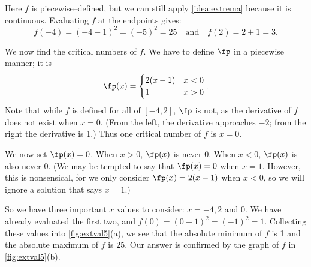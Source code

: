 {%
Here $f$ is piecewise--defined, but we can still apply \autoref{idea:extrema} because it is continuous. Evaluating $f$ at the endpoints gives: 
\[f(-4)=(-4-1)^2=(-5)^2 = 25 \quad \text{and} \quad f(2)=2+1 = 3.\]

We now find the critical numbers of $f$. We have to define $\fp$ in a piecewise manner; it is
\[\fp(x) =\begin{cases} 2(x-1) & x < 0 \\ 1 & x>0 \end{cases} .\]
Note that while $f$ is defined for all of $[-4,2]$, $\fp$ is not, as the derivative of $f$ does not exist when $x=0$. (From the left, the derivative approaches $-2$; from the right the derivative is 1.) Thus one critical number of $f$ is $x=0$.

We now set $\fp(x) = 0$. When $x >0$, $\fp(x)$ is never 0.  When $x<0$, $\fp(x)$ is also never 0. (We may be tempted to say that $\fp(x) = 0 $ when $x=1$. However, this is nonsensical, for we only consider $\fp(x) = 2(x-1)$ when $x<0$, so we will ignore a solution that says $x=1$.) 

So we have three important $x$ values to consider: $x= -4, 2$ and $0$. We have already evaluated the first two, and $f(0)=(0-1)^2=(-1)^2=1$.  Collecting these values into \autoref{fig:extval5}(a), we see that the absolute minimum of $f$ is 1 and the absolute maximum of $f$ is $25$. Our answer is confirmed by the graph of $f$ in \autoref{fig:extval5}(b).}

